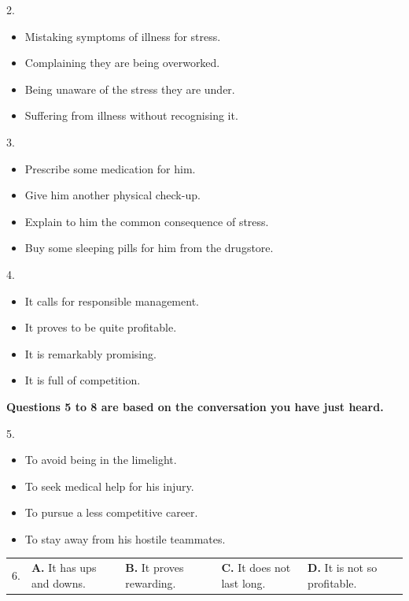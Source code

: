 \documentclass[UTF8,11pt]{ctexart}
\begin{document}
2.


\begin{itemize}[leftmargin=2em,itemsep=.2em,topsep=.4em]\item[A.] Mistaking symptoms of illness for stress.
\item[B.] Complaining they are being overworked.
\item[C.] Being unaware of the stress they are under.
\item[D.] Suffering from illness without recognising it.
\end{itemize}

3.


\begin{itemize}[leftmargin=2em,itemsep=.2em,topsep=.4em]\item[A.] Prescribe some medication for him.
\item[B.] Give him another physical check-up.
\item[C.] Explain to him the common consequence of stress.
\item[D.] Buy some sleeping pills for him from the drugstore.
\end{itemize}

4.


\begin{itemize}[leftmargin=2em,itemsep=.2em,topsep=.4em]\item[A.] It calls for responsible management.
\item[B.] It proves to be quite profitable.
\item[C.] It is remarkably promising.
\item[D.] It is full of competition.
\end{itemize}

\textbf{Questions 5 to 8 are based on the conversation you have just heard.}


5.


\begin{itemize}[leftmargin=2em,itemsep=.2em,topsep=.4em]\item[A.] To avoid being in the limelight.
\item[B.] To seek medical help for his injury.
\item[C.] To pursue a less competitive career.
\item[D.] To stay away from his hostile teammates.
\end{itemize}

\noindent\begin{tabularx}{\linewidth}{@{}lXXXX@{}}6. & \textbf{A.} It has ups and downs. & \textbf{B.} It proves rewarding. & \textbf{C.} It does not last long. & \textbf{D.} It is not so profitable.\\\end{tabularx}\par
\end{document}
